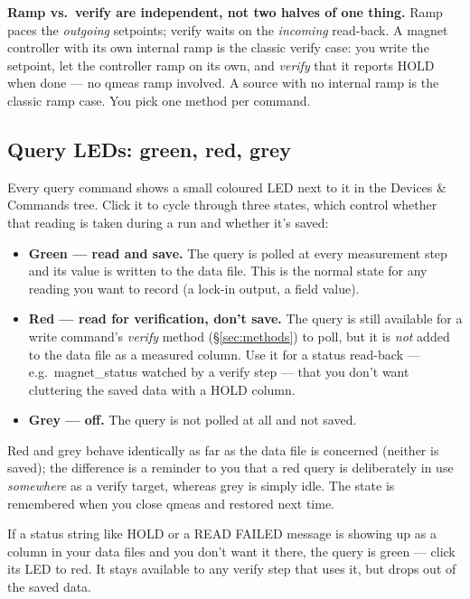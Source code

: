 \documentclass[11pt,a4paper]{article}
\newcommand{\code}[1]{{\ttfamily\color{qcode}#1}}
\begin{document}
\begin{tip}
\textbf{Ramp vs.\ verify are independent, not two halves of one thing.} Ramp
paces the \emph{outgoing} setpoints; verify waits on the \emph{incoming}
read-back. A magnet controller with its own internal ramp is the classic
verify case: you write the setpoint, let the controller ramp on its own, and
\emph{verify} that it reports \code{HOLD} when done --- no qmeas ramp involved.
A source with no internal ramp is the classic ramp case. You pick one method
per command.
\end{tip}

\subsection{Query LEDs: green, red, grey}

Every query command shows a small coloured LED next to it in the Devices \&
Commands tree. Click it to cycle through three states, which control whether
that reading is taken during a run and whether it's saved:

\begin{itemize}
  \item \textbf{Green --- read and save.} The query is polled at every
  measurement step and its value is written to the data file. This is the
  normal state for any reading you want to record (a lock-in output, a field
  value).
  \item \textbf{Red --- read for verification, don't save.} The query is still
  available for a write command's \emph{verify} method (\S\ref{sec:methods}) to
  poll, but it is \emph{not} added to the data file as a measured column. Use
  it for a status read-back --- e.g.\ \code{magnet\_status} watched by a verify
  step --- that you don't want cluttering the saved data with a \code{HOLD}
  column.
  \item \textbf{Grey --- off.} The query is not polled at all and not saved.
\end{itemize}

Red and grey behave identically as far as the data file is concerned (neither
is saved); the difference is a reminder to you that a red query is deliberately
in use \emph{somewhere} as a verify target, whereas grey is simply idle. The
state is remembered when you close qmeas and restored next time.

\begin{tip}
If a status string like \code{HOLD} or a \code{READ FAILED} message is showing
up as a column in your data files and you don't want it there, the query is
green --- click its LED to red. It stays available to any verify step that uses
it, but drops out of the saved data.
\end{tip}
\end{document}
